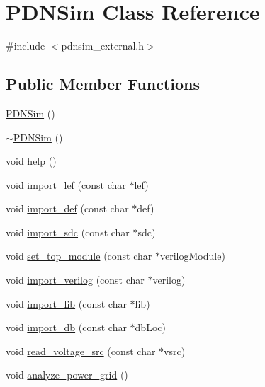 \hypertarget{classPDNSim}{}\section{P\+D\+N\+Sim Class Reference}
\label{classPDNSim}


{\ttfamily \#include $<$pdnsim\+\_\+external.\+h$>$}

\subsection*{Public Member Functions}
\begin{DoxyCompactItemize}
\item 
\hyperlink{classPDNSim_a86bc07bbf31d1110f88903fa70726b0b}{P\+D\+N\+Sim} ()
\item 
\hyperlink{classPDNSim_a0d0fc2643b7352981e5913ae2c47d9cb}{$\sim$\+P\+D\+N\+Sim} ()
\item 
void \hyperlink{classPDNSim_a3cac445e06e27319b2aa64b8cad8cde1}{help} ()
\item 
void \hyperlink{classPDNSim_a7cd5f8f602d788e7fbb8c213e236276a}{import\+\_\+lef} (const char $\ast$lef)
\item 
void \hyperlink{classPDNSim_a9c2a8ef81fe0fcddef6e8e1601cb6195}{import\+\_\+def} (const char $\ast$def)
\item 
void \hyperlink{classPDNSim_abd78e05ce538d6d5251ae06014029002}{import\+\_\+sdc} (const char $\ast$sdc)
\item 
void \hyperlink{classPDNSim_ab072530a5b1cbd7b9405f902c25145fe}{set\+\_\+top\+\_\+module} (const char $\ast$verilog\+Module)
\item 
void \hyperlink{classPDNSim_a245759d29bee801f77c5af4d321bae20}{import\+\_\+verilog} (const char $\ast$verilog)
\item 
void \hyperlink{classPDNSim_a8befa7206975644695d28766b8da8d35}{import\+\_\+lib} (const char $\ast$lib)
\item 
void \hyperlink{classPDNSim_aabfe1dab58f118f970ff9240629a6e4c}{import\+\_\+db} (const char $\ast$db\+Loc)
\item 
void \hyperlink{classPDNSim_a6a6b6a30b8e81842acc13ede2799bf1d}{read\+\_\+voltage\+\_\+src} (const char $\ast$vsrc)
\item 
void \hyperlink{classPDNSim_a21eb3eaf82efb18355aa729601ed7a3a}{analyze\+\_\+power\+\_\+grid} ()
\end{DoxyCompactItemize}
